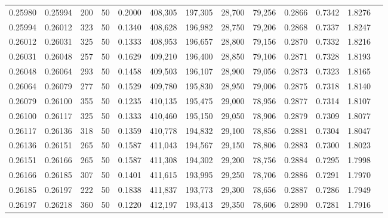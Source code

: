 \begin{tabular}{rrrrrrrrrrrrr}
0.25980 & 0.25994 &   200 &  50 &                                     0.2000 & 408,305 & 197,305 &  28,700 &  79,256 & 0.2866 & 0.7342 & 1.8276 \\
0.25994 & 0.26012 &   323 &  50 &                                     0.1340 & 408,628 & 196,982 &  28,750 &  79,206 & 0.2868 & 0.7337 & 1.8247 \\
0.26012 & 0.26031 &   325 &  50 &                                     0.1333 & 408,953 & 196,657 &  28,800 &  79,156 & 0.2870 & 0.7332 & 1.8216 \\
0.26031 & 0.26048 &   257 &  50 &                                     0.1629 & 409,210 & 196,400 &  28,850 &  79,106 & 0.2871 & 0.7328 & 1.8193 \\
0.26048 & 0.26064 &   293 &  50 &                                     0.1458 & 409,503 & 196,107 &  28,900 &  79,056 & 0.2873 & 0.7323 & 1.8165 \\
0.26064 & 0.26079 &   277 &  50 &                                     0.1529 & 409,780 & 195,830 &  28,950 &  79,006 & 0.2875 & 0.7318 & 1.8140 \\
0.26079 & 0.26100 &   355 &  50 &                                     0.1235 & 410,135 & 195,475 &  29,000 &  78,956 & 0.2877 & 0.7314 & 1.8107 \\
0.26100 & 0.26117 &   325 &  50 &                                     0.1333 & 410,460 & 195,150 &  29,050 &  78,906 & 0.2879 & 0.7309 & 1.8077 \\
0.26117 & 0.26136 &   318 &  50 &                                     0.1359 & 410,778 & 194,832 &  29,100 &  78,856 & 0.2881 & 0.7304 & 1.8047 \\
0.26136 & 0.26151 &   265 &  50 &                                     0.1587 & 411,043 & 194,567 &  29,150 &  78,806 & 0.2883 & 0.7300 & 1.8023 \\
0.26151 & 0.26166 &   265 &  50 &                                     0.1587 & 411,308 & 194,302 &  29,200 &  78,756 & 0.2884 & 0.7295 & 1.7998 \\
0.26166 & 0.26185 &   307 &  50 &                                     0.1401 & 411,615 & 193,995 &  29,250 &  78,706 & 0.2886 & 0.7291 & 1.7970 \\
0.26185 & 0.26197 &   222 &  50 &                                     0.1838 & 411,837 & 193,773 &  29,300 &  78,656 & 0.2887 & 0.7286 & 1.7949 \\
0.26197 & 0.26218 &   360 &  50 &                                     0.1220 & 412,197 & 193,413 &  29,350 &  78,606 & 0.2890 & 0.7281 & 1.7916 \\

\end{tabular}
